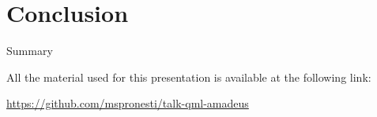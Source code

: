 \section{Conclusion}
	\begin{frame}{Summary}
	
	All the material used for this presentation is available at the following link:
	
	\begin{center}
		\url{https://github.com/mspronesti/talk-qml-amadeus}
	\end{center}
	
	\begin{center}\ccbysa\end{center}
\end{frame}